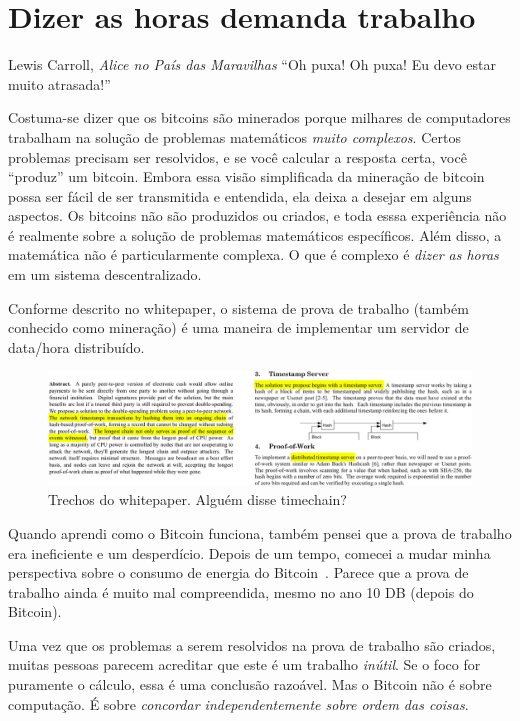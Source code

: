 \chapter{Dizer as horas demanda trabalho}
\label{les:17}

\begin{chapquote}{Lewis Carroll, \textit{Alice no País das Maravilhas}}
\enquote{Oh puxa! Oh puxa! Eu devo estar muito atrasada!}
\end{chapquote}

Costuma-se dizer que os bitcoins são minerados porque milhares de computadores trabalham na solução de problemas matemáticos \textit{muito complexos}. Certos problemas precisam ser resolvidos, e se você calcular a resposta certa, você \enquote{produz} um bitcoin. Embora essa visão simplificada da mineração de bitcoin possa ser fácil de ser transmitida e entendida, ela deixa a desejar em alguns aspectos. Os bitcoins não são produzidos ou criados, e toda esssa experiência não é realmente sobre a solução de problemas matemáticos específicos. Além disso, a matemática não é particularmente complexa. O que é complexo é \textit{dizer as horas} em um sistema descentralizado.

Conforme descrito no whitepaper, o sistema de prova de trabalho (também conhecido como mineração) é uma maneira de implementar um servidor de data/hora distribuído.

\begin{figure}
  \includegraphics{assets/images/bitcoin-whitepaper-timestamp-wide.png}
  \caption{Trechos do whitepaper. Alguém disse timechain?}
  \label{fig:bitcoin-whitepaper-timestamp-wide}
\end{figure}

Quando aprendi como o Bitcoin funciona, também pensei que a prova de trabalho era ineficiente e um desperdício. Depois de um tempo, comecei a mudar minha perspectiva sobre o consumo de energia do Bitcoin~\cite{gigi:energy}. Parece que a prova de trabalho ainda é muito mal compreendida, mesmo no ano 10 DB (depois do Bitcoin).

Uma vez que os problemas a serem resolvidos na prova de trabalho são criados, muitas pessoas parecem acreditar que este é um trabalho \textit{inútil}. Se o foco for puramente o cálculo, essa é uma conclusão razoável. Mas o Bitcoin não é sobre computação. É sobre \textit{concordar independentemente sobre ordem das coisas}.

